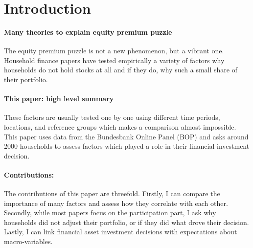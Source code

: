 \documentclass[ProjectABM]{subfiles}
\begin{document}
{\titlepagefinish}

\hypertarget{Introduction}{}
\section{Introduction}\label{sec:intro}

\paragraph{Many theories to explain equity premium puzzle}
The equity premium puzzle is not a new phenomenon, but a vibrant one. Household finance papers have tested empirically a variety of factors why households do not hold stocks at all and if they do, why such a small share of their portfolio.

\paragraph{This paper: high level summary}
These factors are usually tested one by one using different time periods, locations, and reference groups which makes a comparison almost impossible. This paper uses data from the Bundesbank Online Panel (BOP) and asks around 2000 households to assess factors which played a role in their financial investment decision. %

\paragraph{Contributions:}
The contributions of this paper are threefold. Firstly, I can compare the importance of many factors and assess how they correlate with each other. Secondly, while most papers focus on the participation part, I ask why households did not adjust their portfolio, or if they did what drove their decision. Lastly, I can link financial asset investment decisions with expectations about macro-variables.

\end{document}
